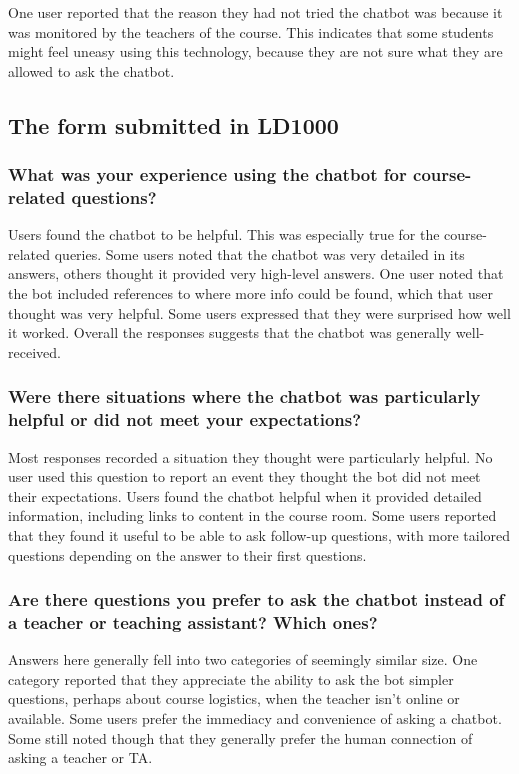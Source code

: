 One user reported that the reason they had not tried the chatbot was because it was monitored by the teachers of the course. This indicates that some students might feel uneasy using this technology, because they are not sure what they are allowed to ask the chatbot.


\subsection{The form submitted in LD1000}


\subsubsection{What was your experience using the chatbot for course-related questions?}


Users found the chatbot to be helpful. This was especially true for the course-related queries. Some users noted that the chatbot was very detailed in its answers, others thought it provided very high-level answers. One user noted that the bot included references to where more info could be found, which that user thought was very helpful. Some users expressed that they were surprised how well it worked. Overall the responses suggests that the chatbot was generally well-received.


\subsubsection{Were there situations where the chatbot was particularly helpful or did not meet your expectations?}


Most responses recorded a situation they thought were particularly helpful. No user used this question to report an event they thought the bot did not meet their expectations. Users found the chatbot helpful when it provided detailed information, including links to content in the course room. Some users reported that they found it useful to be able to ask follow-up questions, with more tailored questions depending on the answer to their first questions.


\subsubsection{Are there questions you prefer to ask the chatbot instead of a teacher or teaching assistant? Which ones?}


Answers here generally fell into two categories of seemingly similar size. One category reported that they appreciate the ability to ask the bot simpler questions, perhaps about course logistics, when the teacher isn’t online or available. Some users prefer the immediacy and convenience of asking a chatbot. Some still noted though that they generally prefer the human connection of asking a teacher or TA.


